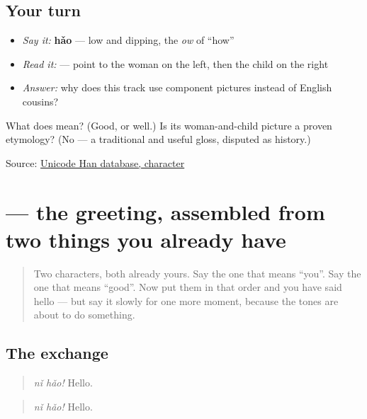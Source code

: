 \subsection*{Your turn}
\begin{itemize}
\raggedright
  \item \emph{Say it:} \textbf{hǎo} — low and dipping, the \emph{ow} of \textquotedblleft{}how\textquotedblright{}
  \item \emph{Read it:} \textbf{} — point to the woman on the left, then the child on the right
  \item \emph{Answer:} why does this track use component pictures instead of English cousins?
\end{itemize}

\begin{tcolorbox}[breakable,colback=teal!4,colframe=teal!35!black,title={Before you move on}]
What does \textbf{} mean? (Good, or well.) Is its woman-and-child picture a proven etymology? (No — a traditional and useful gloss, disputed as history.)

Source: \href{https://www.unicode.org/charts/PDF/U4E00.pdf}{Unicode Han database, character }
\end{tcolorbox}
\section[\texorpdfstring{\zh{你好} (nǐ hǎo)}{你好 (nǐ hǎo)}]{ — the greeting, assembled from two things you already have}

\label{lesson:ZH-C01-nihao}



\begin{quote}
Two characters, both already yours. Say the one that means \textquotedblleft{}you\textquotedblright{}. Say the one that means \textquotedblleft{}good\textquotedblright{}. Now put them in that order and you have said hello — but say it slowly for one more moment, because the tones are about to do something.
\end{quote}

\subsection*{The exchange}
\begin{quote}
\textbf{} \emph{nǐ hǎo!} Hello.
\end{quote}

\begin{quote}
\textbf{} \emph{nǐ hǎo!} Hello.
\end{quote}

